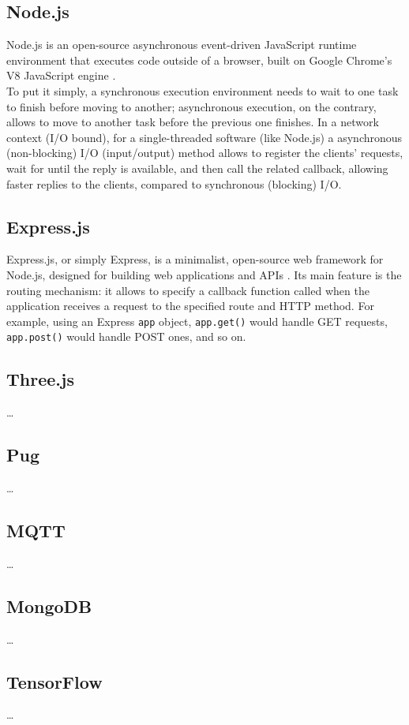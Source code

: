 \subsection{Node.js}
Node.js is an open-source asynchronous event-driven JavaScript runtime environment that executes code outside of a browser, built on Google Chrome's V8 JavaScript engine \cite{Node.js}.\\
To put it simply, a synchronous execution environment needs to wait to one task to finish before moving to another; asynchronous execution, on the contrary, allows to move to another task before the previous one finishes. In a network context (I/O bound), for a single-threaded software (like Node.js) a asynchronous (non-blocking) I/O (input/output) method allows to register the clients' requests, wait for until the reply is available, and then call the related callback, allowing faster replies to the clients, compared to synchronous (blocking) I/O.

\subsection{Express.js}
Express.js, or simply Express, is a minimalist, open-source web framework for Node.js, designed for building web applications and APIs \cite{Express.js}. Its main feature is the routing mechanism: it allows to specify a callback function called when the application receives a request to the specified route and HTTP method. For example, using an Express \texttt{app} object, \texttt{app.get()} would handle GET requests, \texttt{app.post()} would handle POST ones, and so on.

\subsection{Three.js}
\dots

\subsection{Pug}
\dots

\subsection{MQTT}
\dots

\subsection{MongoDB}
\dots

\subsection{TensorFlow}
\dots
